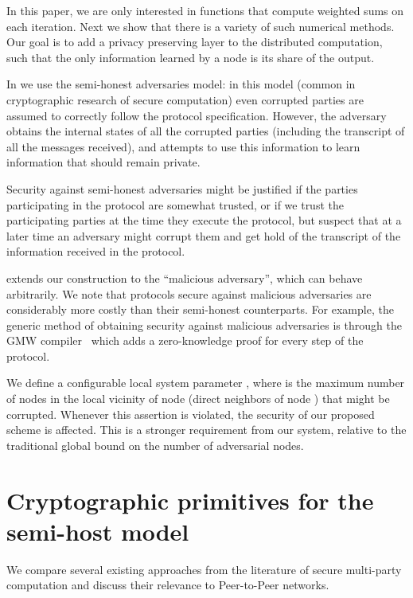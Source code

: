 \documentclass[10pt]{svjour3}
\begin{document}
In this paper, we are only interested in functions  that
compute weighted sums on each iteration. Next we show that there
is a variety of such numerical methods. Our goal is to add a
privacy preserving layer to the distributed computation, such that
the only information learned by a node is its share of the output.

In  we use the semi-honest adversaries model: in this model (common in
cryptographic research of secure computation) even corrupted parties
are assumed to correctly follow the protocol specification. However,
the adversary obtains the internal states of all the corrupted parties
(including the transcript of all the messages received), and attempts
to use this information to learn information that should remain
private.

Security against semi-honest adversaries might be
 justified if the parties participating in the protocol are somewhat
 trusted, or if we trust the participating parties at the time they
 execute the protocol, but suspect that at a later time an adversary
 might corrupt them and get hold of the transcript of the information
 received in the protocol.

 extends our construction to the ``malicious adversary'',
which can behave arbitrarily.  We note that protocols secure against malicious adversaries are
 considerably more costly than their semi-honest counterparts. For
 example, the generic method of obtaining security against malicious
  adversaries is through the GMW compiler~\cite{GMW} which adds a
  zero-knowledge proof for every step of the protocol.




We define a configurable local system parameter , where  is  the
maximum number of nodes in the local vicinity of node 
(direct neighbors of node ) that might be corrupted. Whenever this
assertion is violated, the security of our proposed scheme is
affected. This is a stronger requirement from our system, relative
to the traditional global bound on the number of adversarial
nodes.



\section{Cryptographic primitives for the semi-host model}
\label{crypto} We compare several existing approaches from the
literature of secure multi-party computation and discuss their
relevance to Peer-to-Peer networks.
\end{document}
